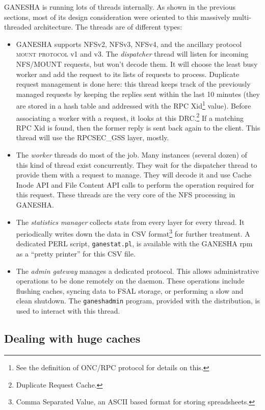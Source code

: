 \documentclass[final]{ols}
\begin{document}
GANESHA is running lots of threads internally. As shown in the
previous sections, most of its design consideration were oriented to
this massively multi-threaded architecture.  The threads are of
different types:
\begin{itemize}
\item GANESHA supports NFSv2, NFSv3, NFSv4, and the ancillary protocol
  \textsc{mount protocol} v1 and v3. The \textit{dispatcher} thread will listen
  for incoming NFS/\linebreak[0]MOUNT requests, but won't decode them. It will
  choose the least busy worker and add the request to its lists of
  requests to process. Duplicate request management is done here:
  this thread keeps track of the previously managed requests by
  keeping the replies sent within the last 10 minutes (they are stored
  in a hash table and addressed with the RPC Xid\footnote{See the
    definition of ONC/RPC protocol for details on this.} value).
  Before associating a worker with a request, it looks at this
  DRC.\footnote{Duplicate Request Cache.} If a matching RPC Xid is
  found, 
  then the former reply is sent back again to the client.  This thread
  will use the RPCSEC\_GSS layer, mostly.
\item The \textit{worker} threads do most of the job. Many instances
  (several dozen) of this kind of thread exist concurrently. They
  wait for the dispatcher thread to provide them with a request to
  manage. They will decode it and use Cache Inode API and File Content
  API calls to perform the operation required for this request. These
  threads are the very core of the NFS processing in GANESHA.
\item The \textit{statistics manager} collects stats from every layer for
  every thread. It periodically writes down the data in CSV
  format\footnote{Comma Separated Value, an ASCII based format for
  storing spreadsheets.} for further treatment. A dedicated PERL script,
  \texttt{ganestat.pl}, is available with the GANESHA rpm as a ``pretty printer''
  for this CSV file.
\item The \textit{admin gateway} manages a dedicated protocol. This
  allows administrative operations to be done remotely on the daemon.
  These operations include flushing caches, syncing data to FSAL
  storage, or performing a slow and clean shutdown. The \texttt{ganeshadmin}
  program, provided with the distribution, is used to interact with
  this thread.
\end{itemize}

\subsection{Dealing with huge caches}
\end{document}
